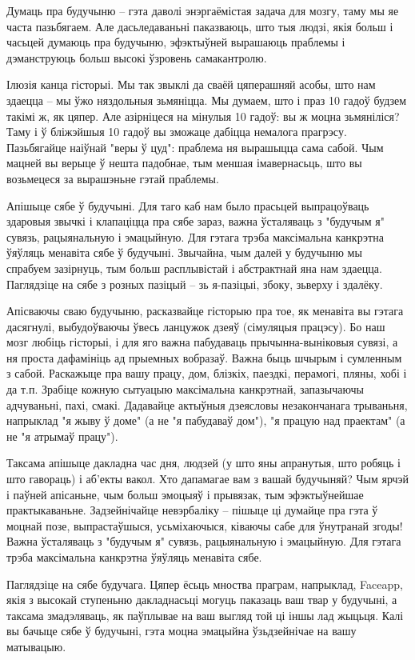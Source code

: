 Думаць пра будучыню – гэта даволі энэргаёмістая задача для мозгу, таму мы яе часта пазьбягаем. Але дасьледаваньні паказваюць, што тыя людзі, якія больш і часьцей думаюць пра будучыню, эфэктыўней вырашаюць праблемы і дэманструюць больш высокі ўзровень самакантролю.

Ілюзія канца гісторыі. Мы так звыклі да сваёй цяперашняй асобы, што нам здаецца – мы ўжо няздольныя зьмяніцца. Мы думаем, што і праз 10 гадоў будзем такімі ж, як цяпер. Але азірніцеся на мінулыя 10 гадоў: вы ж моцна зьмяніліся? Таму і ў бліжэйшыя 10 гадоў вы зможаце дабіцца немалога прагрэсу. Пазьбягайце наіўнай "веры ў цуд": праблема ня вырашыцца сама сабой. Чым мацней вы верыце ў нешта падобнае, тым меншая імавернасьць, што вы возьмецеся за вырашэньне гэтай праблемы.

Апішыце сябе ў будучыні. Для таго каб нам было прасьцей выпрацоўваць здаровыя звычкі і клапаціцца пра сябе зараз, важна ўсталяваць з "будучым я" сувязь, рацыянальную і эмацыйную. Для гэтага трэба максімальна канкрэтна ўяўляць менавіта сябе ў будучыні. Звычайна, чым далей у будучыню мы спрабуем зазірнуць, тым больш расплывістай і абстрактнай яна нам здаецца. Паглядзіце на сябе з розных пазіцый – зь я-пазіцыі, збоку, зьверху і здалёку.

Апісваючы сваю будучыню, расказвайце гісторыю пра тое, як менавіта вы гэтага дасягнулі, выбудоўваючы ўвесь ланцужок дзеяў (сімуляцыя працэсу). Бо наш мозг любіць гісторыі, і для яго важна пабудаваць прычынна-выніковыя сувязі, а ня проста дафамініць ад прыемных вобразаў. Важна быць шчырым і сумленным з сабой. Раскажыце пра вашу працу, дом, блізкіх, паездкі, перамогі, пляны, хобі і да т.п. Зрабіце кожную сытуацыю максімальна канкрэтнай, запазычаючы адчуваньні, пахі, смакі. Дадавайце актыўныя дзеясловы незакончанага трываньня, напрыклад "я жыву ў доме" (а не "я пабудаваў дом"), "я працую над праектам" (а не "я атрымаў працу").

Таксама апішыце дакладна час дня, людзей (у што яны апранутыя, што робяць і што гавораць) і аб'екты вакол. Хто дапамагае вам з вашай будучыняй? Чым ярчэй і паўней апісаньне, чым больш эмоцыяў і прывязак, тым эфэктыўнейшае практыкаваньне. Задзейнічайце невэрбаліку – пішыце ці думайце пра гэта ў моцнай позе, выпрастаўшыся, усьміхаючыся, ківаючы сабе для ўнутранай згоды! Важна ўсталяваць з "будучым я" сувязь, рацыянальную і эмацыйную. Для гэтага трэба максімальна канкрэтна ўяўляць менавіта сябе.

Паглядзіце на сябе будучага. Цяпер ёсьць мноства праграм, напрыклад, Faceapp, якія з высокай ступеньню дакладнасьці могуць паказаць ваш твар у будучыні, а таксама змадэляваць, як паўплывае на ваш выгляд той ці іншы лад жыцьця. Калі вы бачыце сябе ў будучыні, гэта моцна эмацыйна ўзьдзейнічае на вашу матывацыю.

